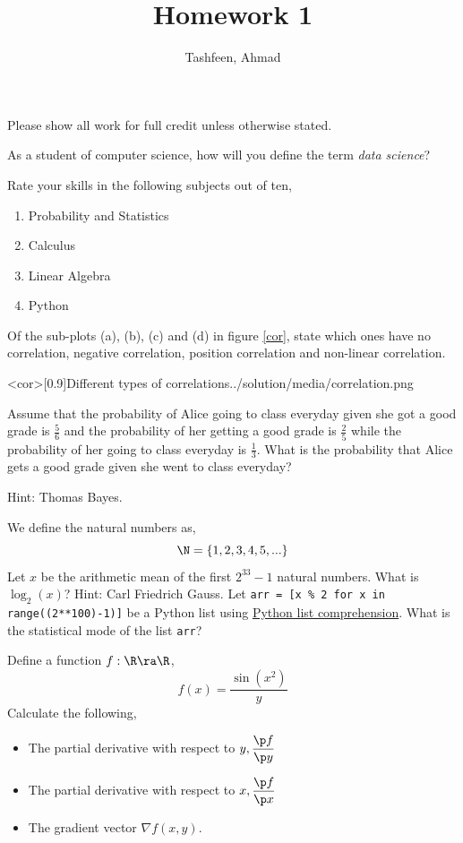 \documentclass{homework}
\author{Tashfeen, Ahmad}
\title{Homework 1}
\begin{document}
 \maketitle

Please show all work for full credit unless otherwise stated.

\question As a student of computer science, how will you define the term \textit{data science}?

\question Rate your skills in the following subjects out of ten,
\begin{enumerate}
    \item Probability and Statistics
    \item Calculus
    \item Linear Algebra
    \item Python
\end{enumerate}

\question Of the sub-plots (a), (b), (c) and (d) in figure \ref{cor}, state which ones have no correlation, negative correlation, position correlation and non-linear correlation.

\img<cor>[0.9]{Different types of correlations.}{./solution/media/correlation.png}

\question Assume that the probability of Alice going to class everyday given she got a good grade is $\frac{5}{6}$ and the probability of her getting a good grade is $\frac{2}{5}$ while the probability of her going to class everyday is $\frac{1}{3}$. What is the probability that Alice gets a good grade given she went to class everyday?

Hint: Thomas Bayes.

\question We define the natural numbers as,
\[
    \N = \{1, 2, 3, 4, 5, ...\}
\]
Let $x$ be the arithmetic mean of the first $2^{33}-1$ natural numbers. What is $\log_2(x)$? Hint: Carl Friedrich Gauss.
\question Let \texttt{arr = [x \% 2 for x in range((2**100)-1)]} be a Python list using \href{https://www.w3schools.com/python/python_lists_comprehension.asp}{Python list comprehension}. What is the statistical mode of the list \texttt{arr}?

\question Define a function $f:\R\ra\R$,
\[
    f(x) = \frac{\sin(x^2)}{y}
\]
Calculate the following,
\begin{itemize}
    \item The partial derivative with respect to $y, \displaystyle\frac{\p f}{\p y}$
    \item The partial derivative with respect to $x, \displaystyle\frac{\p f}{\p x}$
    \item The gradient vector $\nabla f(x, y)$.
\end{itemize}
\end{document}
